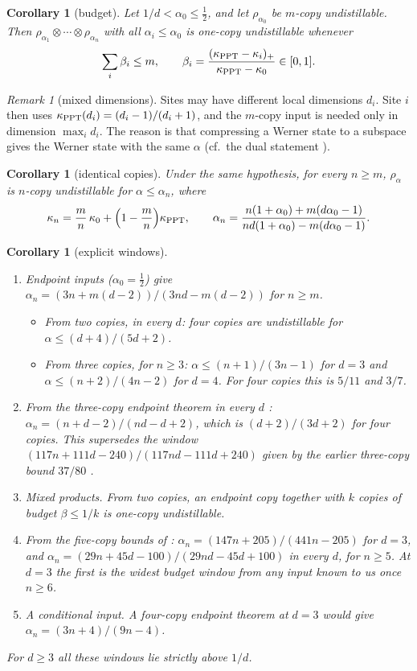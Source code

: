 \documentclass[11pt]{article}
\newtheorem{corollary}[theorem]{Corollary}
\theoremstyle{remark}
\newtheorem{remark}[theorem]{Remark}
\begin{document}
\begin{corollary}[budget]\label{cor:budget}
Let $1/d<\alpha_0\le\frac12$, and let $\rho_{\alpha_0}$ be $m$-copy undistillable. Then
$\rho_{\alpha_1}\otimes\cdots\otimes\rho_{\alpha_n}$ with all $\alpha_i\le\alpha_0$ is one-copy undistillable whenever
\[
\sum_i\beta_i\le m,\qquad \beta_i=\frac{(\kappa_{\rm PPT}-\kappa_i)_+}{\kappa_{\rm PPT}-\kappa_0}\in[0,1].
\]
\end{corollary}

\begin{remark}[mixed dimensions]
Sites may have different local dimensions $d_i$. Site $i$ then uses $\kappa_{\rm PPT}(d_i)=(d_i-1)/(d_i+1)$, and the
$m$-copy input is needed only in dimension $\max_id_i$. The reason is that compressing a Werner state to a subspace
gives the Werner state with the same $\alpha$ (cf.\ the dual statement \cite[Lemma~2.4(b)]{MB}).
\end{remark}

\begin{corollary}[identical copies]\label{cor:identical}
Under the same hypothesis, for every $n\ge m$, $\rho_\alpha$ is $n$-copy undistillable for $\alpha\le\alpha_n$, where
\[
\kappa_n=\frac mn\,\kappa_0+\Big(1-\frac mn\Big)\kappa_{\rm PPT},\qquad
\alpha_n=\frac{n(1+\alpha_0)+m(d\alpha_0-1)}{nd(1+\alpha_0)-m(d\alpha_0-1)} .
\]
\end{corollary}

\begin{corollary}[explicit windows]\label{cor:explicit}
\begin{enumerate}
\item[(i)] Endpoint inputs ($\alpha_0=\tfrac12$) give $\alpha_n=(3n+m(d-2))/(3nd-m(d-2))$ for $n\ge m$.
\begin{itemize}
\item From two copies, in every $d$: four copies are undistillable for $\alpha\le(d+4)/(5d+2)$.
\item From three copies, for $n\ge3$: $\alpha\le(n+1)/(3n-1)$ for $d=3$ and $\alpha\le(n+2)/(4n-2)$ for $d=4$. For
four copies this is $5/11$ and $3/7$.
\end{itemize}
\item[(ii)] From the three-copy endpoint theorem in every $d$ \cite{Tomar}: $\alpha_n=(n+d-2)/(nd-d+2)$, which is
$(d+2)/(3d+2)$ for four copies. This supersedes the window $(117n+111d-240)/(117nd-111d+240)$ given by the earlier
three-copy bound $37/80$ \cite[Thm.~1.3]{MB}.
\item[(iii)] Mixed products. From two copies, an endpoint copy together with $k$ copies of budget $\beta\le1/k$ is
one-copy undistillable.
\item[(iv)] From the five-copy bounds of \cite{Tomar}: $\alpha_n=(147n+205)/(441n-205)$ for $d=3$, and
$\alpha_n=(29n+45d-100)/(29nd-45d+100)$ in every $d$, for $n\ge5$. At $d=3$ the first is the widest budget window
from any input known to us once $n\ge6$.
\item[(v)] A conditional input. A four-copy endpoint theorem at $d=3$ would give $\alpha_n=(3n+4)/(9n-4)$.
\end{enumerate}
For $d\ge3$ all these windows lie strictly above $1/d$.
\end{corollary}
\end{document}
